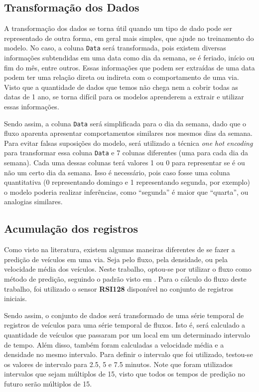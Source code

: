 \subsection{Transformação dos Dados}

A transformação dos dados se torna útil quando um tipo de dado pode ser representado de outra forma, em geral mais simples, que ajude no treinamento do modelo. No caso, a coluna \texttt{Data} será transformada, pois existem diversas informações subtendidas em uma data como dia da semana, se é feriado, início ou fim do mês, entre outros. Essas informações que podem ser extraídas de uma data podem ter uma relação direta ou indireta com o comportamento de uma via. Visto que a quantidade de dados que temos não chega nem a cobrir todas as datas de 1 ano, se torna difícil para os modelos aprenderem a extrair e utilizar essas informações. 

Sendo assim, a coluna \texttt{Data} será simplificada para o dia da semana, dado que o fluxo aparenta apresentar comportamentos similares nos mesmos dias da semana. Para evitar falsas suposições do modelo, será utilizado a técnica \textit{one hot encoding} para transformar essa coluna \texttt{Data} e 7 colunas diferentes (uma para cada dia da semana). Cada uma dessas colunas terá valores 1 ou 0 para representar se é ou não um certo dia da semana. Isso é necessário, pois caso fosse uma coluna quantitativa (0 representando domingo e 1 representando segunda, por exemplo) o modelo poderia realizar inferências, como ``segunda'' é maior que ``quarta'', ou analogias similares.

\subsection{Acumulação dos registros}

Como visto na literatura, existem algumas maneiras diferentes de se fazer a predição de veículos em uma via. Seja pelo fluxo, pela densidade, ou pela velocidade média dos veículos. Neste trabalho, optou-se por utilizar o fluxo como método de predição, seguindo o padrão visto em \cite{lana_2018}. Para o cálculo do fluxo deste trabalho, foi utilizado o sensor \textbf{RSI128} disponível no conjunto de registros iniciais.

Sendo assim, o conjunto de dados será transformado de uma série temporal de registros de veículos para uma série temporal de fluxos. Isto é, será calculado a quantidade de veículos que passaram por um local em um determinado intervalo de tempo. Além disso, também foram calculadas a velocidade média e a densidade no mesmo intervalo. Para definir o intervalo que foi utilizado, testou-se os valores de intervalo para 2.5, 5 e 7.5 minutos. Note que foram utilizados intervalos que sejam múltiplos de 15, visto que todos os tempos de predição no futuro serão múltiplos de 15.

